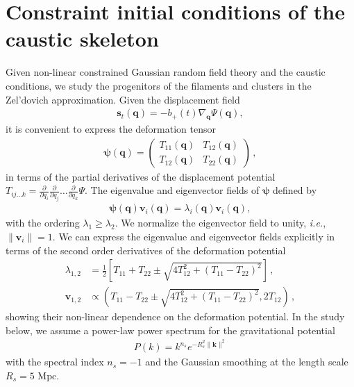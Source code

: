 \documentclass[a4paper, 11pt]{article}
\begin{document}
\section{Constraint initial conditions of the caustic skeleton}\label{sec:caustic_skeleton_constraints}
Given non-linear constrained Gaussian random field theory and the caustic conditions, we study the progenitors of the filaments and clusters in the Zel'dovich approximation. Given the displacement field 
\begin{align}
\bm{s}_t(\bm{q}) = -b_+(t) \nabla_{\bm{q}} \Psi(\bm{q}),
\end{align}
it is convenient to express the deformation tensor
\begin{align}
\bm{\psi}(\bm{q}) = \begin{pmatrix} T_{11}(\bm{q}) & T_{12}(\bm{q}) \\ T_{12}(\bm{q}) & T_{22}(\bm{q})\end{pmatrix}\,,
\end{align}
in terms of the partial derivatives of the displacement potential $T_{ij\dots k}=\frac{\partial}{\partial q_i}\frac{\partial}{\partial q_j}\dots \frac{\partial}{\partial q_k}\Psi$. The eigenvalue and eigenvector fields of $\bm{\psi}$ defined by
\begin{align}
\bm{\psi}(\bm{q}) \bm{v}_i(\bm{q}) = \lambda_i(\bm{q}) \bm{v}_i(\bm{q}),
\end{align}
with the ordering $\lambda_1\geq \lambda_2$. We normalize the eigenvector field to unity, \textit{i.e.}, $\|\bm{v}_{i}\|=1$. We can express the eigenvalue and eigenvector fields explicitly in terms of the second order derivatives of the deformation potential
\begin{align}
\lambda_{1,2} &= \frac{1}{2}\left[T_{11}+T_{22} \pm \sqrt{4 T_{12}^2+(T_{11}-T_{22})^2}\right]\,,\\
\bm{v}_{1,2} &\propto  \left(T_{11}-T_{22} \pm \sqrt{4 T_{12}^2+(T_{11}-T_{22})^2}, 2 T_{12}\right)\,,
\end{align}
showing their non-linear dependence on the deformation potential. In the study below, we assume a power-law power spectrum for the gravitational potential
\begin{align}
P(k)=k^{n_s} e^{-R_s^2 \|\bm{k}\|^2}
\end{align}
with the spectral index $n_s=-1$ and the Gaussian smoothing at the length scale $R_s = 5 \text{ Mpc}$.

\end{document}
